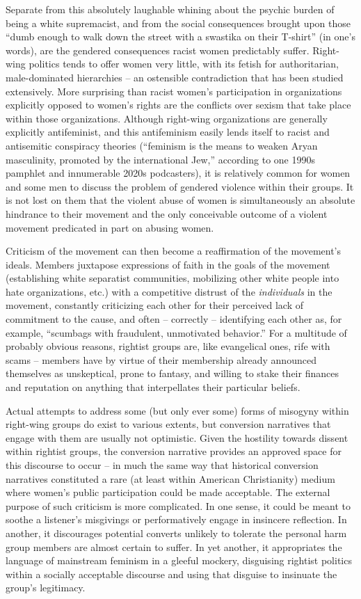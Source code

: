 \documentclass[11pt]{article}
\begin{document}
Separate from this absolutely laughable whining about the psychic burden of being a white supremacist, and from the social consequences brought upon those ``dumb enough to walk down the street with a swastika on their T-shirt'' (in one's words), are the gendered consequences racist women predictably suffer. Right-wing politics tends to offer women very little, with its fetish for authoritarian, male-dominated hierarchies -- an ostensible contradiction that has been studied extensively. More surprising than racist women's participation in organizations explicitly opposed to women's rights are the conflicts over sexism that take place within those organizations. Although right-wing organizations are generally explicitly antifeminist, and this antifeminism easily lends itself to racist and antisemitic conspiracy theories (``feminism is the means to weaken Aryan masculinity, promoted by the international Jew,'' according to one 1990s pamphlet and innumerable 2020s podcasters\autocite[145]{Bl02}), it is relatively common for women and some men to discuss the problem of gendered violence within their groups. It is not lost on them that the violent abuse of women is simultaneously an absolute hindrance to their movement and the only conceivable outcome of a violent movement predicated in part on abusing women. 

Criticism of the movement can then become a reaffirmation of the movement's ideals. Members juxtapose expressions of faith in the goals of the movement (establishing white separatist communities, mobilizing other white people into hate organizations, etc.) with a competitive distrust of the \textit{individuals} in the movement, constantly criticizing each other for their perceived lack of commitment to the cause, and often -- correctly -- identifying each other as, for example, ``scumbags with fraudulent, unmotivated behavior.''\autocite[50]{Bl02} For a multitude of probably obvious reasons, rightist groups are, like evangelical ones, rife with scams -- members have by virtue of their membership already announced themselves as unskeptical, prone to fantasy, and willing to stake their finances and reputation on anything that interpellates their particular beliefs. 

Actual attempts to address some (but only ever some) forms of misogyny within right-wing groups do exist to various extents, but conversion narratives that engage with them are usually not optimistic. Given the hostility towards dissent within rightist groups, the conversion narrative provides an approved space for this discourse to occur -- in much the same way that historical conversion narratives constituted a rare (at least within American Christianity) medium where women's public participation could be made acceptable.\autocite[93]{Br91} The external purpose of such criticism is more complicated. In one sense, it could be meant to soothe a listener's misgivings or performatively engage in insincere reflection. In another, it discourages potential converts unlikely to tolerate the personal harm group members are almost certain to suffer. In yet another, it appropriates the language of mainstream feminism in a gleeful mockery, disguising rightist politics within a socially acceptable discourse and using that disguise to insinuate the group's legitimacy. 
\end{document}
